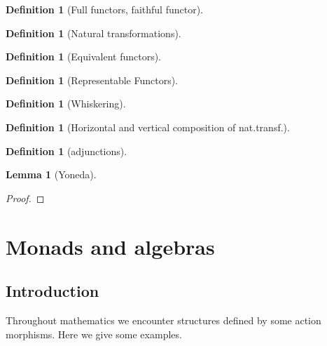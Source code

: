 \documentclass[a4paper,11pt,twoside, openany]{book}
\theoremstyle{definition}
\theoremstyle{definition}
\newtheorem{defn}[thm]{Definition} %
\newtheorem{lemma}[thm]{Lemma}
\theoremstyle{remark}
\begin{document}
	\begin{defn}[Full functors, faithful functor]
		
	\end{defn}
	
	\begin{defn}[Natural transformations]
		
	\end{defn}
	
	\begin{defn}[Equivalent functors]
	\end{defn}
	
	\begin{defn}[Representable Functors]
		
	\end{defn}
	
	\begin{defn}[Whiskering]
		
	\end{defn}
	
	\begin{defn}[Horizontal and vertical composition of nat.transf.]
		
	\end{defn}
	
	\begin{defn}[adjunctions]
		
	\end{defn}
	
	\begin{lemma}[Yoneda]
		
	\end{lemma}
	\begin{proof}
		
	\end{proof}
	
	\chapter{Monads and algebras}
	
	\section{Introduction}
		
	Throughout mathematics we encounter structures defined by some action morphisms. Here we give some examples.
	
\end{document}

